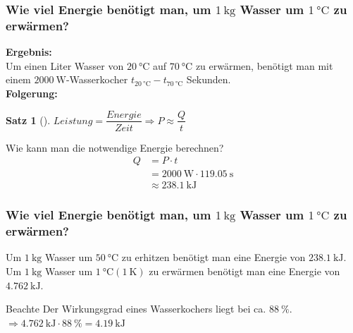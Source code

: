 \documentclass{article}
\newtheorem{satz}{Satz}
\begin{document}
\frame
{
  \frametitle{Wie viel Energie benötigt man, um $\SI{1}{\kilogram} $ Wasser um $\SI{1}{\celsius} $ zu erwärmen?}
\textbf{Ergebnis:}\\
Um einen Liter Wasser von $\SI{20}{\celsius} $ auf $\SI{70}{\celsius} $ zu erwärmen, benötigt man mit einem $\SI{2000}{\watt} $-Wasserkocher $t_{\SI{20}{\celsius}} - t_{\SI{70}{\celsius}}$ Sekunden.\\
\vspace{0.3cm}
\textbf{Folgerung:}\\
	\begin{satz}[]
		{$ Leistung = \dfrac{Energie}{Zeit}\Rightarrow P\approx\dfrac{Q}{t}$}
	\end{satz}
Wie kann man die notwendige Energie berechnen?
  \begin{align*}
	Q&=P \cdot t\\
	&=\SI{2000}{\watt} \cdot \SI{119,05}{\second}\\
	&\approx \SI{238.1}{\kilo\joule}
  \end{align*}
}

\frame
{
  \frametitle{Wie viel Energie benötigt man, um $\SI{1}{\kilogram} $ Wasser um $\SI{1}{\celsius} $ zu erwärmen?}

Um $\SI{1}{\kilogram} $ Wasser um $\SI{50}{\celsius} $ zu erhitzen benötigt man eine Energie von $\SI{238.1}{\kilo\joule}$. \\
\vspace{0.3cm}
Um $\SI{1}{\kilogram} $ Wasser um $\SI{1}{\celsius} (\SI{1}{\kelvin}) $ zu erwärmen benötigt man eine Energie von $\SI{4.762}{\kilo\joule}$.
	\begin{alertblock}{Beachte}
		Der Wirkungsgrad eines Wasserkochers liegt bei ca. $\SI{88}{\%}$. $\Rightarrow \SI{4.762}{\kilo\joule}\cdot\SI{88}{\%}=\SI{4.19}{\kilo\joule} $
	\end{alertblock}

}
\end{document}
